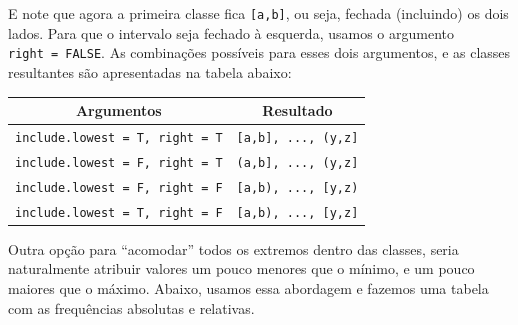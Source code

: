 \documentclass[10pt,a4paper]{book}
\begin{document}
E note que agora a primeira classe fica \texttt{{[}a,b{]}}, ou seja,
fechada (incluindo) os dois lados. Para que o intervalo seja fechado à
esquerda, usamos o argumento \texttt{right\ =\ FALSE}. As combinações
possíveis para esses dois argumentos, e as classes resultantes são
apresentadas na tabela abaixo:

\begin{longtable}[]{@{}cc@{}}
\toprule
Argumentos & Resultado\tabularnewline
\midrule
\endhead
\texttt{include.lowest\ =\ T,\ right\ =\ T} &
\texttt{{[}a,b{]},\ ...,\ (y,z{]}}\tabularnewline
\texttt{include.lowest\ =\ F,\ right\ =\ T} &
\texttt{(a,b{]},\ ...,\ (y,z{]}}\tabularnewline
\texttt{include.lowest\ =\ F,\ right\ =\ F} &
\texttt{{[}a,b),\ ...,\ {[}y,z)}\tabularnewline
\texttt{include.lowest\ =\ T,\ right\ =\ F} &
\texttt{{[}a,b),\ ...,\ {[}y,z{]}}\tabularnewline
\bottomrule
\end{longtable}

Outra opção para ``acomodar'' todos os extremos dentro das classes,
seria naturalmente atribuir valores um pouco menores que o mínimo, e um
pouco maiores que o máximo. Abaixo, usamos essa abordagem e fazemos uma
tabela com as frequências absolutas e relativas.
\end{document}
